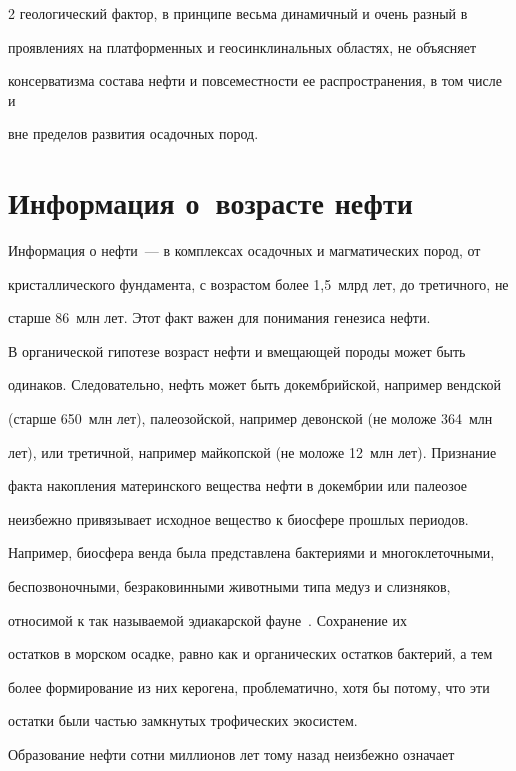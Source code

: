 \begin{multicols}{2}
геологический фактор, в принципе весьма динамичный и очень разный в 

проявлениях на платформенных и геосинклинальных областях, не объясняет 

консерватизма состава нефти и повсеместности ее распространения, в том числе и 

вне пределов развития осадочных пород. 

     

\section{Информация о~возрасте нефти}



     Информация о нефти~--- в комплексах осадочных и магматических пород, от 

кристаллического фундамента, с возрастом более 1,5~млрд лет, до третичного, не 

старше 86~млн лет. Этот факт важен для понимания генезиса нефти. 

     

     В органической гипотезе возраст нефти и вмещающей породы может быть 

одинаков. Следовательно, нефть может быть докембрийской, напри\-мер вендской 

(старше 650~млн лет), палеозойской, например девонской (не моложе 364~млн 

лет), или третичной, например майкопской (не моложе 12~млн лет). Признание 

факта накопления материнского вещества нефти в докембрии или палеозое 

неизбежно привязывает исходное вещество к биосфере прошлых периодов. 

Например, биосфера венда была представлена бактериями и многоклеточными, 

беспозвоночными, безраковинными животными типа медуз и слизняков, 

относимой к так называемой эдиакарской фауне~\cite{14s}. Сохранение их 

остатков в морском осадке, равно как и органических остатков бактерий, а тем 

более формирование из них керогена, проблематично, хотя бы потому, что эти 

остатки были частью замкнутых трофических экосистем.

     

     Образование нефти сотни миллионов лет тому назад неизбежно означает 


\end{multicols}
